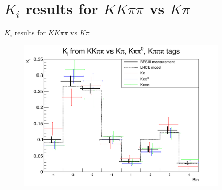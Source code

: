 \documentclass{beamer}
\begin{document}
\section{\texorpdfstring{$K_i$}{Ki} results for \texorpdfstring{$KK\pi\pi$}{KKpipi} vs \texorpdfstring{$K\pi$}{Kpi}}
\begin{frame}{$K_i$ results for $KK\pi\pi$ vs $K\pi$}
  \begin{figure}
    \centering
    \includegraphics[width=0.9\textwidth]{Plots/Ki_Measured_vs_Model.png}
  \end{figure}
\end{frame}
\end{document}
